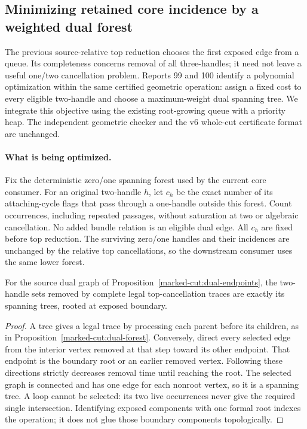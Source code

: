 \subsection{Minimizing retained core incidence by a weighted dual forest}
\label{marked-cut:weighted-top}

The previous source-relative top reduction chooses the first exposed edge
from a queue. Its completeness concerns removal of all three-handles; it
need not leave a useful one/two cancellation problem. Reports 99 and 100
identify a polynomial optimization within the same certified geometric
operation: assign a fixed cost to every eligible two-handle and choose a
maximum-weight dual spanning tree. We integrate this objective using the
existing root-growing queue with a priority heap. The independent geometric
checker and the v6 whole-cut certificate format are unchanged.

\paragraph{What is being optimized.}
Fix the deterministic zero/one spanning forest used by the current core
consumer. For an original two-handle $h$, let $c_h$ be the exact number of
its attaching-cycle flags that pass through a one-handle outside this
forest. Count occurrences, including repeated passages, without saturation
at two or algebraic cancellation. No added bundle relation is an eligible
dual edge. All $c_h$ are fixed before top reduction. The surviving
zero/one handles and their incidences are unchanged by the relative top
cancellations, so the downstream consumer uses the same lower forest.

\begin{proposition}
For the source dual graph of Proposition~\ref{marked-cut:dual-endpoints},
the two-handle sets removed by complete legal top-cancellation traces are
exactly its spanning trees, rooted at exposed boundary.
\end{proposition}
\begin{proof}
A tree gives a legal trace by processing each parent before its children,
as in Proposition~\ref{marked-cut:dual-forest}. Conversely, direct every
selected edge from the interior vertex removed at that step toward its
other endpoint. That endpoint is the boundary root or an earlier removed
vertex. Following these directions strictly decreases removal time until
reaching the root. The selected graph is connected and has one edge for
each nonroot vertex, so it is a spanning tree. A loop cannot be selected:
its two live occurrences never give the required single intersection.
Identifying exposed components with one formal root indexes the operation;
it does not glue those boundary components topologically.
\end{proof}

